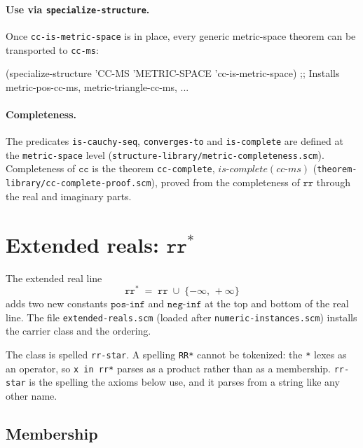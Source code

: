 \paragraph{Use via \texttt{specialize-structure}.}
Once \texttt{cc-is-metric-space} is in place, every generic
metric-space theorem can be transported to \texttt{cc-ms}:
\begin{VNBcode}
(specialize-structure 'CC-MS 'METRIC-SPACE 'cc-is-metric-space)
;; Installs metric-pos-cc-ms, metric-triangle-cc-ms, ...
\end{VNBcode}

\paragraph{Completeness.}
The predicates \texttt{is-cauchy-seq}, \texttt{converges-to} and
\texttt{is-complete} are defined at the \texttt{metric-space} level
(\texttt{structure-library/metric-completeness.scm}).  Completeness of
$\mathtt{cc}$ is the theorem \texttt{cc-complete},
$\mathit{is\text{-}complete}(\mathit{cc\text{-}ms})$
(\texttt{theorem-library/cc-complete-proof.scm}), proved from the
completeness of $\mathtt{rr}$ through the real and imaginary parts.

\section{Extended reals: $\mathtt{rr}^{*}$}
\label{sec:extended-reals}

The extended real line
\[
   \mathtt{rr}^{*} \;=\; \mathtt{rr} \;\cup\; \{-\infty,\, +\infty\}
\]
adds two new constants $\mathtt{pos\text{-}inf}$ and
$\mathtt{neg\text{-}inf}$ at the top and bottom of the real line.  The
file \texttt{extended-reals.scm} (loaded after \texttt{numeric-instances.scm})
installs the carrier class and the ordering.

\begin{remark}
The class is spelled \texttt{rr-star}.  A spelling \texttt{RR*} cannot
be tokenized: the \texttt{*} lexes as an operator, so \texttt{x in rr*}
parses as a product rather than as a membership.  \texttt{rr-star} is
the spelling the axioms below use, and it parses from a string like any
other name.
\end{remark}

\subsection{Membership}

